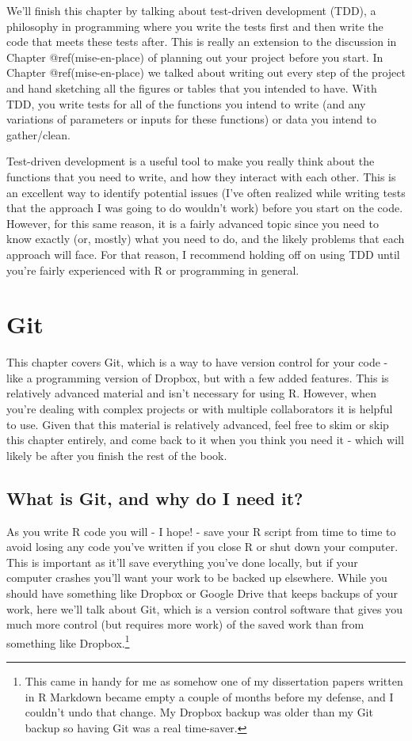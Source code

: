 \documentclass[
  a4paper,
]{krantz}
\begin{document}
We'll finish this chapter by talking about test-driven
development (TDD), a philosophy in programming where you
write the tests first and then write the code that meets
these tests after. This is really an extension to the
discussion in Chapter @ref(mise-en-place) of planning out
your project before you start. In Chapter
@ref(mise-en-place) we talked about writing out every step
of the project and hand sketching all the figures or tables
that you intended to have. With TDD, you write tests for all
of the functions you intend to write (and any variations of
parameters or inputs for these functions) or data you intend
to gather/clean.

Test-driven development is a useful tool to make you really
think about the functions that you need to write, and how
they interact with each other. This is an excellent way to
identify potential issues (I've often realized while writing
tests that the approach I was going to do wouldn't work)
before you start on the code. However, for this same reason,
it is a fairly advanced topic since you need to know exactly
(or, mostly) what you need to do, and the likely problems
that each approach will face. For that reason, I recommend
holding off on using TDD until you're fairly experienced
with R or programming in general.

\hypertarget{git}{%
\chapter{Git}\label{git}}

This chapter covers Git, which is a way to have version
control for your code - like a programming version of
Dropbox, but with a few added features. This is relatively
advanced material and isn't necessary for using R. However,
when you're dealing with complex projects or with multiple
collaborators it is helpful to use. Given that this material
is relatively advanced, feel free to skim or skip this
chapter entirely, and come back to it when you think you
need it - which will likely be after you finish the rest of
the book.

\hypertarget{what-is-git-and-why-do-i-need-it}{%
\section{What is Git, and why do I need
it?}\label{what-is-git-and-why-do-i-need-it}}

As you write R code you will - I hope! - save your R script
from time to time to avoid losing any code you've written if
you close R or shut down your computer. This is important as
it'll save everything you've done locally, but if your
computer crashes you'll want your work to be backed up
elsewhere. While you should have something like Dropbox or
Google Drive that keeps backups of your work, here we'll
talk about Git, which is a version control software that
gives you much more control (but requires more work) of the
saved work than from something like Dropbox.\footnote{This
  came in handy for me as somehow one of my dissertation
  papers written in R Markdown became empty a couple of
  months before my defense, and I couldn't undo that change.
  My Dropbox backup was older than my Git backup so having
  Git was a real time-saver.}
\end{document}
